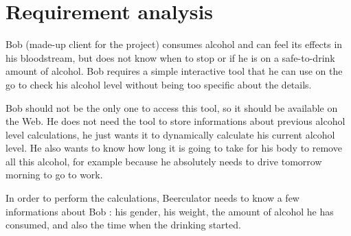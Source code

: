 \section{Requirement analysis}
\label{sec:req}

Bob (made-up client for the project) consumes alcohol and can feel its effects in his bloodstream, but does not know when to stop or if he is on a safe-to-drink amount of alcohol. Bob requires a simple interactive tool that he can use on the go to check his alcohol level without being too specific about the details.
  
Bob should not be the only one to access this tool, so it should be available on the Web. He does not need the tool to store informations about previous alcohol level calculations, he just wants it to dynamically calculate his current alcohol level. He also wants to know how long it is going to take for his body to remove all this alcohol, for example because he absolutely needs to drive tomorrow morning to go to work.

In order to perform the calculations, Beerculator needs to know a few informations about Bob : his gender, his weight, the amount of alcohol he has consumed, and also the time when the drinking started.
